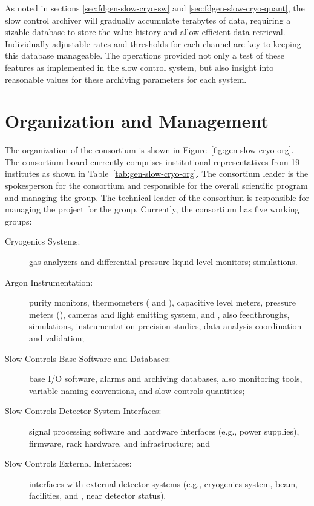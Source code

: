 As noted in sections \ref{sec:fdgen-slow-cryo-sw} and \ref{sec:fdgen-slow-cryo-quant},
the slow control archiver will gradually accumulate terabytes of
data, requiring a sizable database to store the value history and
allow efficient data retrieval. Individually adjustable rates and
thresholds for each channel are key to keeping this database
manageable. The  operations provided not only a test of
these features as implemented in the  slow control system, but also insight into
reasonable values for these archiving parameters for each system.


\section{Organization and Management}
\label{sec:cisc-slow-controls-org}


The organization of the  consortium is shown in
 Figure~\ref{fig:gen-slow-cryo-org}. The  consortium board currently comprises institutional representatives from 19 institutes as shown in Table~\ref{tab:gen-slow-cryo-org}.  The consortium leader is the spokesperson for the consortium and responsible for the overall scientific program and managing the group. The technical leader of the consortium is responsible for managing the project for the group. Currently, the
consortium has five working groups:
\begin{description}
 \item[Cryogenics Systems:] gas analyzers and differential pressure liquid level
  monitors;  simulations.
 \item[Argon Instrumentation:] purity monitors, thermometers ( and ), capacitive level meters, pressure meters (), cameras and light emitting system, and , also feedthroughs, \efield simulations, instrumentation precision studies,  data analysis coordination and validation; 
 \item [Slow Controls Base Software and Databases:]  base I/O software, alarms and archiving databases, also monitoring tools,
   variable naming conventions, and slow controls quantities;
 \item [Slow Controls Detector System Interfaces:] signal processing software and hardware interfaces (e.g., power supplies), firmware, rack hardware, and infrastructure;   and 
 \item [Slow Controls External Interfaces:] interfaces with external detector systems (e.g., cryogenics system, beam, facilities, and , near detector status).
\end{description}


